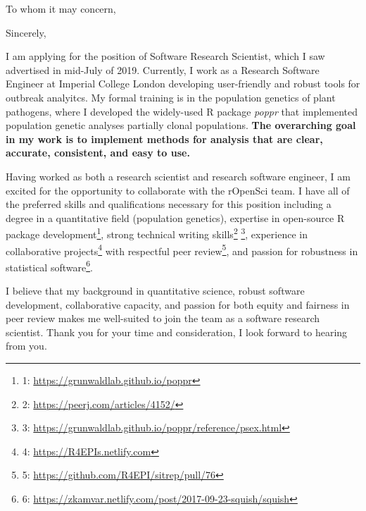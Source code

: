 


\clearpage

\date{\today} %
\opening{To whom it may concern,} %
\closing{Sincerely,} %

\makelettertitle %

I am applying for the position of Software Research Scientist, which I saw
advertised in mid-July of 2019. Currently, I work as a Research Software
Engineer at Imperial College London developing user-friendly and robust tools
for outbreak analyitcs. My formal training is in the population genetics of
plant pathogens, where I developed the widely-used R package \textit{poppr}
that implemented population genetic analyses partially clonal populations.
\textbf{The overarching goal in my work is to implement methods for analysis
that are clear, accurate, consistent, and easy to use.}

Having worked as both a research scientist and research software engineer, I am
excited for the opportunity to collaborate with the rOpenSci team. I have all of
the preferred skills and qualifications necessary for this position including
a degree in a quantitative field (population genetics), expertise in
open-source R package development\footnote{1:
\url{https://grunwaldlab.github.io/poppr}}, strong technical writing
skills\footnote{2: \url{https://peerj.com/articles/4152/}} \footnote{3:
\url{https://grunwaldlab.github.io/poppr/reference/psex.html}}, experience in
collaborative projects\footnote{4: \url{https://R4EPIs.netlify.com}} with
respectful peer review\footnote{5:
\url{https://github.com/R4EPI/sitrep/pull/76}}, and passion for robustness in
statistical software\footnote{6: \url{https://zkamvar.netlify.com/post/2017-09-23-squish/squish}}.

I believe that my background in quantitative science, robust software
development, collaborative capacity, and passion for both equity and 
fairness in peer review makes me well-suited to join the team as a software
research scientist. Thank you for your time and consideration,
I look forward to hearing from you. 

